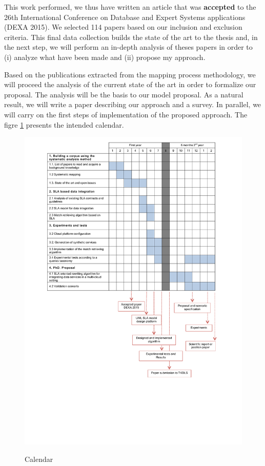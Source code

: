\documentclass[12pt,a4paper,oneside]{report}
\begin{document}
This work performed, we thus have written an article that was \textbf{accepted} to the 26th International Conference on Database and Expert Systems applications (DEXA 2015).
We selected 114 papers based on our inclusion and exclusion criteria. This final data collection builds the state of the art to the thesis and, in the next step, we will perform an in-depth analysis of theses papers in order to (i) analyze what have been made and (ii) propose my approach.  

\bigskip
Based on the publications extracted from the mapping process methodology, we will proceed the analysis of the current state of the art in order to formalize our proposal. The analysis will be the basis to our model proposal. As a natural result, we will write a paper describing our approach and a survey. In parallel, we will carry on the first steps of implementation of the proposed approach.
The figre \ref{fig:calendar} presents the intended calendar. 


\begin{figure}[!h]
\center
\includegraphics[scale=0.95]{calendario.pdf} 
\label{fig:calendar}\caption{Calendar}
\end{figure}



\end{document}
